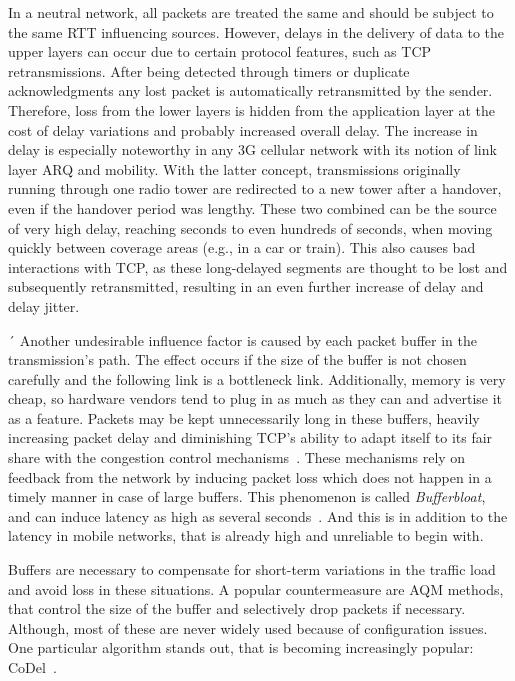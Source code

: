 In a neutral network, all packets are treated the same and should be subject to the same \gls{RTT} influencing sources.
However, delays in the delivery of data to the upper layers can occur due to certain protocol features, such as \gls{TCP} retransmissions. After being detected through timers or duplicate acknowledgments any lost packet is automatically retransmitted by the sender. Therefore, loss from the lower layers is hidden from the application layer at the cost of delay variations and probably increased overall delay. The increase in delay is especially noteworthy in any \gls{3G} cellular network with its notion of link layer \gls{ARQ} and mobility. With the latter concept, transmissions originally running through one radio tower are redirected to a new tower after a handover, even if the handover period was lengthy. These two combined can be the source of very high delay, reaching seconds to even hundreds of seconds, when moving quickly between coverage areas (e.g., in a car or train). 
This also causes bad interactions with \gls{TCP}, as these long-delayed segments are thought to be lost and subsequently retransmitted, resulting in an even further increase of delay and delay jitter.

´
Another undesirable influence factor is caused by each packet buffer in the transmission's path. The effect occurs if the size of the buffer is not chosen carefully and the following link is a bottleneck link. Additionally, memory is very cheap, so hardware vendors tend to plug in as much as they can and advertise it as a feature. Packets may be kept unnecessarily long in these buffers, heavily increasing packet delay and diminishing \gls{TCP}'s ability to adapt itself to its fair share with the congestion control mechanisms~\cite{jacobson1988congestion,scharf2011comparison}. These mechanisms rely on feedback from the network by inducing packet loss which does not happen in a timely manner in case of large buffers. This phenomenon is called \textit{Bufferbloat}, and can induce latency as high as several seconds~\cite{gettys2011bufferbloat,groenewegen2011detecting}. And this is in addition to the latency in mobile networks, that is already high and unreliable to begin with.

Buffers are necessary to compensate for short-term variations in the traffic load and avoid loss in these situations. A popular countermeasure are \gls{AQM} methods, that control the size of the buffer and selectively drop packets if necessary. Although, most of these are never widely used because of configuration issues. One particular algorithm stands out, that is becoming increasingly popular: CoDel~\cite{Nichols:2012:CQD:2209249.2209264, nichols2014codel}.

